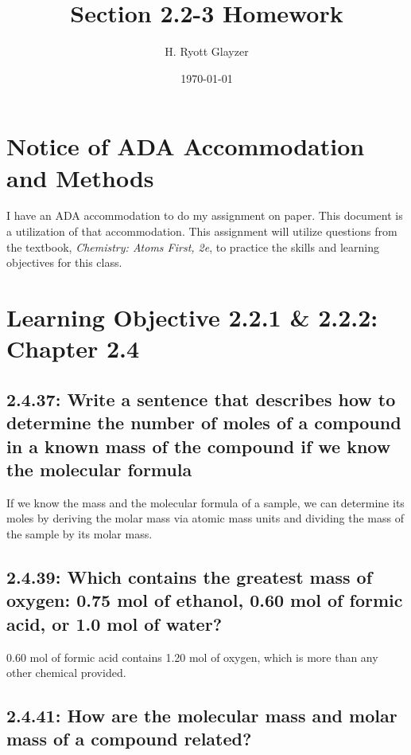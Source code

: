 \documentclass[11pt, letterpaper]{article}
\begin{document}


\title{Section 2.2-3 Homework}
\author{H. Ryott Glayzer}
\date{\today}


\maketitle


\section*{Notice of ADA Accommodation and Methods}
I have an ADA accommodation to do my assignment on paper.
This document is a utilization of that accommodation.
This assignment will utilize questions from the textbook,
\textit{Chemistry: Atoms First, 2e}, to practice the skills
and learning objectives for this class.

\section*{Learning Objective 2.2.1 \& 2.2.2: Chapter 2.4}
\subsection*{2.4.37: Write a sentence that describes how to determine the number of
moles of a compound in a known mass of the compound if we know the molecular formula}

If we know the mass and the molecular formula of a sample, we can determine its moles
by deriving the molar mass via atomic mass units and dividing the mass of the sample 
by its molar mass.

\subsection*{2.4.39: Which contains the greatest mass of oxygen: 0.75 mol of ethanol,
0.60 mol of formic acid, or 1.0 mol of water?}

0.60 mol of formic acid contains 1.20 mol of oxygen, which is more than any other
chemical provided.

\subsection*{2.4.41: How are the molecular mass and molar mass of a compound related?}
\end{document}
